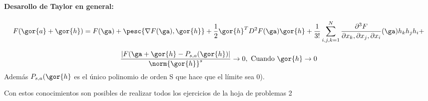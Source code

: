 \paragraph{Desarollo de Taylor en general:}

$$F(\gor{a}+\gor{h}) = F(\ga) + \pesc{\nabla F(\ga),\gor{h}} + \frac{1}{2} \gor{h}^T D^2F(\ga)\gor{h} + \frac{1}{3!}\sum_{i,j,k=1}^N \frac{\partial^3F}{\partial x_k,\partial x_j, \partial x_i} (\ga) h_kh_jh_i + $$

\begin{theorem}
 $$\frac{|F(\ga+\gor{h} - P_{s,a}(\gor{h})|}{\norm{\gor{h}}^s} \rightarrow 0, \text{ Cuando } \gor{h} \rightarrow 0$$
 Además $P_{s,a}(\gor{h}$ es el único polinomio de orden S que hace que el límite sea 0).
\end{theorem}

Con estos conocimientos son posibles de realizar todos los ejercicios de la hoja de problemas 2